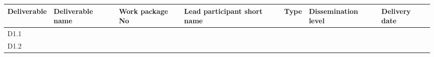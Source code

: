 \documentclass[]{article}
\begin{document}
\begin{longtable}[]{@{}lllllll@{}}
\toprule
\begin{minipage}[b]{0.08\columnwidth}\raggedright
Deliverable\strut
\end{minipage} & \begin{minipage}[b]{0.12\columnwidth}\raggedright
Deliverable name\strut
\end{minipage} & \begin{minipage}[b]{0.12\columnwidth}\raggedright
Work package No\strut
\end{minipage} & \begin{minipage}[b]{0.19\columnwidth}\raggedright
Lead participant short name\strut
\end{minipage} & \begin{minipage}[b]{0.04\columnwidth}\raggedright
Type\strut
\end{minipage} & \begin{minipage}[b]{0.14\columnwidth}\raggedright
Dissemination level\strut
\end{minipage} & \begin{minipage}[b]{0.10\columnwidth}\raggedright
Delivery date\strut
\end{minipage}\tabularnewline
\midrule
\endhead
\begin{minipage}[t]{0.08\columnwidth}\raggedright
D1.1\strut
\end{minipage} & \begin{minipage}[t]{0.12\columnwidth}\raggedright
\strut
\end{minipage} & \begin{minipage}[t]{0.12\columnwidth}\raggedright
\strut
\end{minipage} & \begin{minipage}[t]{0.19\columnwidth}\raggedright
\strut
\end{minipage} & \begin{minipage}[t]{0.04\columnwidth}\raggedright
\strut
\end{minipage} & \begin{minipage}[t]{0.14\columnwidth}\raggedright
\strut
\end{minipage} & \begin{minipage}[t]{0.10\columnwidth}\raggedright
\strut
\end{minipage}\tabularnewline
\begin{minipage}[t]{0.08\columnwidth}\raggedright
D1.2\strut
\end{minipage} & \begin{minipage}[t]{0.12\columnwidth}\raggedright

\end{minipage}
\end{longtable}
\end{document}
